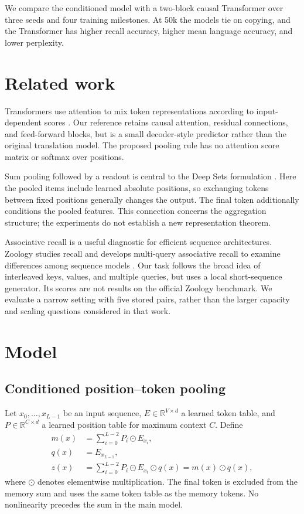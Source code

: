 \documentclass[11pt]{article}
\begin{document}
We compare the conditioned model with a two-block causal Transformer over three seeds and four training milestones. At 50k the models tie on copying, and the Transformer has higher recall accuracy, higher mean language accuracy, and lower perplexity.

\section{Related work}
Transformers use attention to mix token representations according to input-dependent scores \cite{transformer}. Our reference retains causal attention, residual connections, and feed-forward blocks, but is a small decoder-style predictor rather than the original translation model. The proposed pooling rule has no attention score matrix or softmax over positions.

Sum pooling followed by a readout is central to the Deep Sets formulation \cite{deepsets}. Here the pooled items include learned absolute positions, so exchanging tokens between fixed positions generally changes the output. The final token additionally conditions the pooled features. This connection concerns the aggregation structure; the experiments do not establish a new representation theorem.

Associative recall is a useful diagnostic for efficient sequence architectures. Zoology studies recall and develops multi-query associative recall to examine differences among sequence models \cite{zoology}. Our task follows the broad idea of interleaved keys, values, and multiple queries, but uses a local short-sequence generator. Its scores are not results on the official Zoology benchmark. We evaluate a narrow setting with five stored pairs, rather than the larger capacity and scaling questions considered in that work.

\section{Model}
\subsection{Conditioned position--token pooling}
Let $x_0,\ldots,x_{L-1}$ be an input sequence, $E\in\mathbb{R}^{V\times d}$ a learned token table, and $P\in\mathbb{R}^{C\times d}$ a learned position table for maximum context $C$. Define
\begin{align}
 m(x)&=\sum_{i=0}^{L-2}P_i\odot E_{x_i},\\
 q(x)&=E_{x_{L-1}},\\
 z(x)&=\sum_{i=0}^{L-2}P_i\odot E_{x_i}\odot q(x)
      =m(x)\odot q(x),\label{eq:pool}
\end{align}
where $\odot$ denotes elementwise multiplication. The final token is excluded from the memory sum and uses the same token table as the memory tokens. No nonlinearity precedes the sum in the main model.
\end{document}

